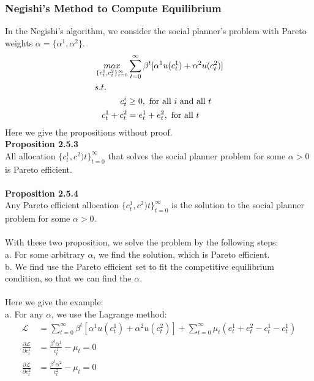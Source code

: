 \documentclass{article}
\begin{document}
\subsubsection{Negishi's Method to Compute Equilibrium}
In the Negishi's algorithm, we consider the social planner's problem with Pareto weights $\alpha = \{\alpha^1, \alpha^2\}$.
\begin{align*}
	&\mathop{max}\limits_{\{c^1_t, c^2_t\}^\infty_{t=0}} \sum\limits^\infty_{t=0} \beta^t [\alpha^1 u(c^1_t) + \alpha^2 u(c^2_t)] \\
	&s.t. \\
	&\indent \indent c^i_t \geq 0,\ \text{for all $i$ and all $t$} \\
	&\ \ \,  c^1_t + c^2_t = e^1_t + e^2_t,\ \text{for all $t$}
\end{align*}
Here we give the propositions without proof.\\
\textbf{Proposition 2.5.3}\\
All allocation $\{c^1_t, c^2)t\}^\infty_{t=0}$ that solves the social planner problem for some $\alpha > 0$ is Pareto efficient.\\\\
\textbf{Proposition 2.5.4}\\
Any Pareto efficient allocation $\{c^1_t, c^2)t\}^\infty_{t=0}$ is the solution to the social planner problem for some $\alpha > 0$.\\\\
With these two proposition, we solve the problem by the following steps:\\
a. For some arbitrary $\alpha$, we find the solution, which is Pareto efficient.\\
b. We find use the Pareto efficient set to fit the competitive equilibrium condition, so that we can find the $\alpha$.\\\\
Here we give the example:\\
a. For any $\alpha$, we use the Lagrange method:
\begin{align}
	\mathscr{L} &= \sum\limits^\infty_{t=0} \beta^t [\alpha^1 u(c^1_t) + \alpha^2 u(c^2_t)] + \sum\limits^\infty_{t=0} \mu_t(e^1_t + e^2_t - c^1_t - c^1_t)  \nonumber\\
	\frac{\partial \mathscr{L}}{\partial c^1_t} &= \frac{\beta^t \alpha^1}{c^1_t} - \mu_t = 0 \label{eq: 251} \\
	\frac{\partial \mathscr{L}}{\partial c^2_t} &= \frac{\beta^t \alpha^2}{c^2_t} - \mu_t = 0 \label{eq: 252}
\end{align}
\end{document}
